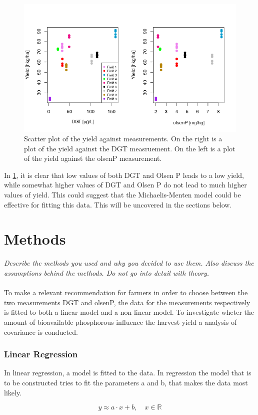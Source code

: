 \documentclass[11pt, fleqn, titlepage]{article}
\begin{document}
\begin{figure}[H]
	\centering
	\includegraphics[width=0.7\linewidth]{billeder/measurementz}
	\caption{Scatter plot of the yield against measurements. On the right is a plot of the yield against the DGT measruement. On the left is a plot of the yield against the olsenP measurement.}
	\label{fig:measurementz}
\end{figure}

In \ref{fig:measurementz}, it is clear that low values of both DGT and Olsen P leads to a low yield, while somewhat higher values of DGT and Olsen P do not lead to much higher values of yield. This could suggest that the Michaelis-Menten model could be effective for fitting this data. This will be uncovered in the sections below.

\section{Methods}
\textit{Describe the methods you used and why you decided to use them. Also discuss the assumptions behind the methods. Do not go into detail with theory.}\\\\ 
To make a relevant recommendation for farmers in order to choose between the two measurements DGT and olsenP, the data for the measurements respectively is fitted to both a linear model and a non-linear model. To investigate wheter the amount of bioavailable phosphorous influence the harvest yield a analysis of covariance is conducted.

\subsubsection*{Linear Regression}
In linear regression, a model is fitted to the data. In regression the model that is to be constructed tries to fit the parameters a and b, that makes the data most likely.

\[ y \approx a \cdot x + b, \quad x \in \mathbb R  \]
\end{document}
